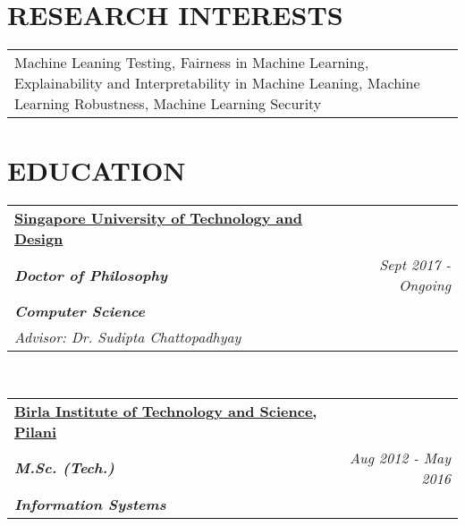 \documentclass[margin]{res}
\begin{document}
%




\address{\href{mailto:sakshi_udeshi@mymail.sutd.edu.sg}{sakshi\_udeshi@mymail.sutd.edu.sg} \\ +65-88294529}
\address{11 Simei Street 4, \\Singapore,  529866}

                    
                        
\begin{resume}  

\section{RESEARCH INTERESTS} 
\begin{tabular}{p{5in}} 
Machine Leaning Testing, Fairness in Machine 
Learning, Explainability and Interpretability in Machine Leaning, Machine Learning Robustness, Machine Learning Security  
\end{tabular}        
 

\section{EDUCATION}

\begin{tabular}{p{4.2in} r} 
\textbf{\href{https://www.sutd.edu.sg}{Singapore University of Technology and Design}}  &\\
                \textbf{\textit{Doctor of Philosophy}} &
                \textit{Sept 2017 - Ongoing} \\
                \textbf{\textit{Computer Science}} & \\
                {\textit{Advisor: Dr. Sudipta Chattopadhyay}} & \\
                
\end{tabular} \\

\begin{tabular}{p{4.2in} r} 
       \textbf{\href{http://www.bits-pilani.ac.in/goa/}{Birla Institute of Technology and Science, Pilani}} & \\
                \textbf{\textit{M.Sc. (Tech.)}} &
                \textit{Aug 2012 - May 2016} \\
                \textbf{\textit{Information Systems}} & \\
\end{tabular}
               

\end{resume}
\end{document}

